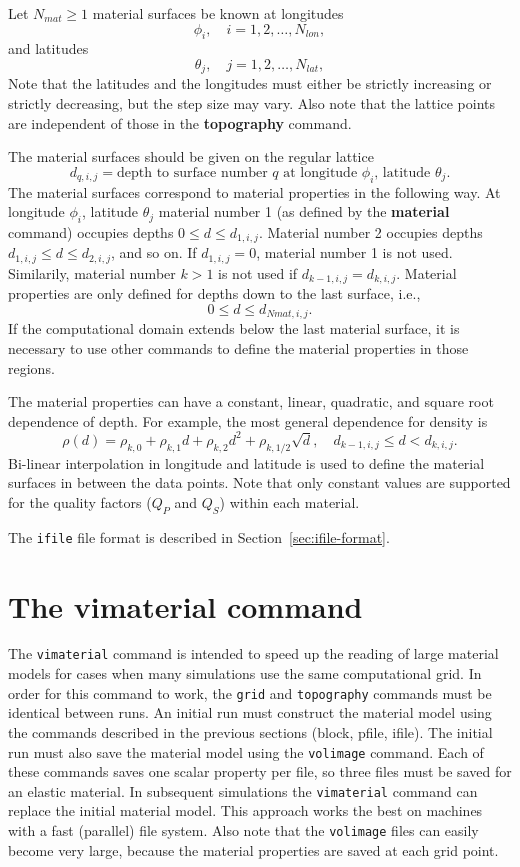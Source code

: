\documentclass[11pt]{report}
\begin{document}
Let $N_{mat}\geq 1$ material surfaces be known at longitudes
\[
\phi_i,\quad i=1,2,\ldots,N_{lon},
\]
and latitudes
\[
\theta_j,\quad j=1,2,\ldots,N_{lat},
\]
Note that the latitudes and the longitudes must either be strictly increasing or strictly
decreasing, but the step size may vary. Also note that the lattice points are independent of those
in the {\bf topography} command.

The material surfaces should be given on the regular lattice
\[
d_{q,i,j} = \mbox{depth to surface number $q$ at longitude $\phi_i$, latitude $\theta_j$.}
\]
The material surfaces correspond to material properties in the following way. At longitude $\phi_i$,
latitude $\theta_j$ material number 1 (as defined by the {\bf material} command) occupies depths
$0\leq d \leq d_{1,i,j}$. Material number 2 occupies depths $d_{1,i,j} \leq d \leq d_{2,i,j}$, and
so on. If $d_{1,i,j}=0$, material number 1 is not used. Similarily, material number $k>1$ is not
used if $d_{k-1,i,j} = d_{k,i,j}$. Material properties are only defined for depths down to the last
surface, i.e.,
\[
0\leq d \leq d_{Nmat,i,j}.
\]
If the computational domain extends below the last material surface, it is necessary to use other
commands to define the material properties in those regions.

The material properties can have a constant, linear, quadratic, and square root dependence of
depth. For example, the most general dependence for density is
\[
\rho(d) = \rho_{k,0} + \rho_{k,1} d + \rho_{k,2} d^2 + \rho_{k,1/2} \sqrt{d},\quad d_{k-1,i,j} \leq d < d_{k,i,j}.
\]
Bi-linear interpolation in longitude and latitude is used to define the material surfaces in between
the data points. Note that only constant values are supported for the quality factors
($Q_P$ and $Q_S$) within each material. 

The \verb+ifile+ file format is described in Section~\ref{sec:ifile-format}.

\section{The vimaterial command}\label{sec:vimat}

The \verb+vimaterial+ command is intended to speed up the reading of large material models for cases
when many simulations use the same computational grid. In order for this command to work, the
\verb+grid+ and \verb+topography+ commands must be identical between runs. An initial run must
construct the material model using the commands described in the previous sections (block,
pfile, ifile). The initial run must also save the material model using the \verb+volimage+
command. Each of these commands saves one scalar property per file, so three files must be saved for
an elastic material. In subsequent simulations the \verb+vimaterial+ command can replace the initial
material model. This approach works the best on machines with a fast (parallel) file system. Also
note that the \verb+volimage+ files can easily become very large, because the material properties
are saved at each grid point.
\end{document}
